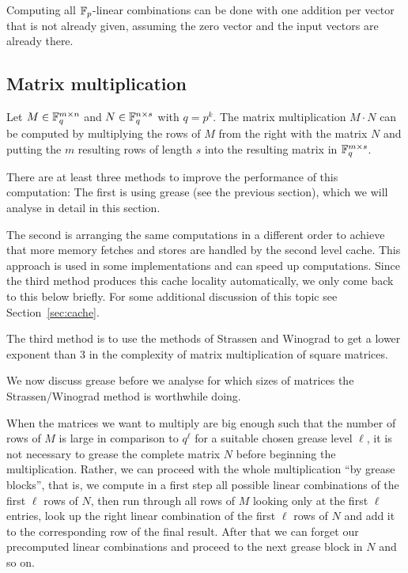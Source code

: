 \begin{Rem}
Computing all $\mathbb{F}_p$-linear combinations can be done
with one addition per vector that is not already given, assuming
the zero vector and the input vectors are already there.
\end{Rem}

\subsection{Matrix multiplication}

Let $M \in \mathbb{F}_q^{m \times n}$ and $N \in \mathbb{F}_q^{n \times s}$ with $q = p^k$.
The matrix multiplication $M \cdot N$ can be computed by multiplying the
rows of $M$ from the right with the matrix $N$ and putting the $m$ resulting
rows of length $s$ into the resulting matrix in $\mathbb{F}_q^{m \times s}$.

There are at least three methods to improve the performance of this
computation: The first is using grease (see the previous section), which
we will analyse in detail in this section. 

The second is arranging the same computations in a different order to 
achieve that more memory fetches and stores are handled by the second
level cache. This approach is used in some implementations and can
speed up computations. Since the third method produces this cache locality
automatically, we only come back to this below briefly.
For some additional discussion of this topic see Section~\ref{sec:cache}. 

The third method is to use the methods of Strassen and Winograd to
%
get a lower exponent than $3$ in the complexity of matrix multiplication
of square matrices.

We now discuss grease before we analyse for which sizes of
matrices the Strassen/Winograd method is worthwhile doing.

When the matrices we want to multiply are big enough such that the number
of rows of $M$ is large in comparison to $q^\ell$
for a suitable chosen grease level $\ell$, it is not necessary to grease
the complete matrix $N$ before beginning the multiplication. Rather,
we can proceed with the whole multiplication ``by grease blocks'', that
is, we compute in a first step all possible linear combinations of the
first $\ell$ rows of $N$, then run through all rows of $M$ looking
only at the first $\ell$ entries, look up the right
linear combination of the first $\ell$ rows of $N$ and add it 
to the corresponding
row of the final result. After that we can forget our precomputed linear
combinations and proceed to the next grease block in $N$ and so on.

